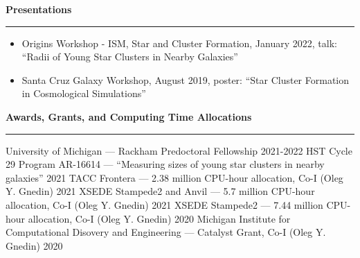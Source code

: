 \documentclass[10pt]{article}
\newcommand{\header}[1]{\vspace{2em}\par \textbf{\large #1}\strut\hrule\vspace{0em}}
\newcommand{\justifiedItemDate}[2]{\newline\null#1 \hfill #2}
\newcommand{\justifiedItemDateFirst}[2]{#1 \hfill #2}
\begin{document}
\header{Presentations}
\begin{itemize}
    \item Origins Workshop - ISM, Star and Cluster Formation, January 2022, talk: ``Radii of Young Star Clusters in Nearby Galaxies''
    \item Santa Cruz Galaxy Workshop, August 2019, poster: ``Star Cluster Formation in Cosmological Simulations''
\end{itemize}


\header{Awards, Grants, and Computing Time Allocations}
\justifiedItemDateFirst{University of Michigan --- Rackham Predoctoral Fellowship}{2021-2022}
\justifiedItemDate{HST Cycle 29 Program AR-16614 --- ``Measuring sizes of young
star clusters in nearby galaxies''}{2021}
\justifiedItemDate{TACC Frontera --- 2.38 million CPU-hour allocation, Co-I (Oleg Y. Gnedin)}{2021}
\justifiedItemDate{XSEDE Stampede2 and Anvil --- 5.7 million CPU-hour allocation, Co-I (Oleg Y. Gnedin)}{2021}
\justifiedItemDate{XSEDE Stampede2 --- 7.44 million CPU-hour allocation, Co-I (Oleg Y. Gnedin)}{2020}
\justifiedItemDate{Michigan Institute for Computational Disovery and Engineering --- Catalyst Grant, Co-I (Oleg Y. Gnedin)}{2020}
\end{document}
